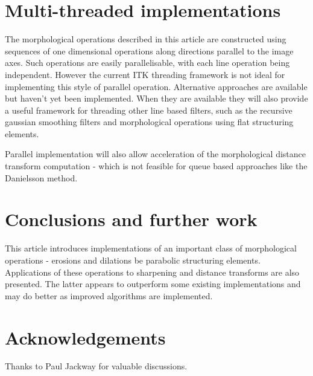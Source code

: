 \documentclass{InsightArticle}
\begin{document}
\section{Multi-threaded implementations}
\label{sect:threading}
The morphological operations described in this article are constructed
using sequences of one dimensional operations along directions
parallel to the image axes. Such operations are easily parallelisable,
with each line operation being independent. However the current ITK
threading framework is not ideal for implementing this style of
parallel operation. Alternative approaches are available but haven't
yet been implemented. When they are available they will also provide a
useful framework for threading other line based filters, such as the
recursive gaussian smoothing filters and morphological operations
using flat structuring elements.

Parallel implementation will also allow acceleration of the
morphological distance transform computation - which is not feasible
for queue based approaches like the Danielsson method.


\section{Conclusions and further work}
This article introduces implementations of an important class of
morphological operations - erosions and dilations be parabolic
structuring elements. Applications of these operations to sharpening
and distance transforms are also presented. The latter appears to
outperform some existing implementations and may do better as improved
algorithms are implemented.

\section*{Acknowledgements}
Thanks to Paul Jackway for valuable discussions.




\nocite{ITKSoftwareGuide}
\end{document}
